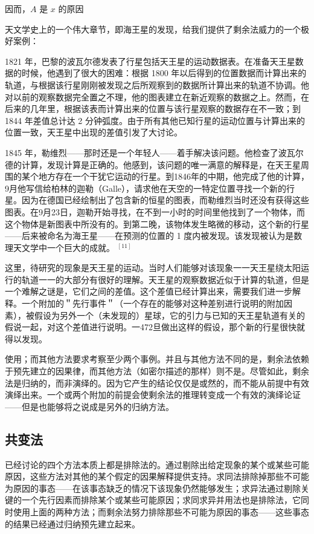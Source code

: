 因而，$A$ 是 $x$ 的原因

天文学史上的一个伟大章节，即海王星的发现，给我们提供了剩余法威力的一个极好案例：

1821 年，巴黎的波瓦尔德发表了行星包括天王星的运动数据表。在准备天王星数据的时候，他遇到了很大的困难：根据 1800 年以后得到的位置数据而计算出来的轨道，与根据该行星刚刚被发现之后所观察到的数据所计算出来的轨道不协调。他对以前的观察数据完全置之不理，他的图表建立在新近观察的数据之上。然而，在后来的几年里，根据该表而计算出来的位置与该行星观察的数据存在不一致；到 1844 年差值总计达 2 分钟弧度。由于所有其他已知行星的运动位置与计算出来的位置一致，天王星中出现的差值引发了大讨论。

1845 年，勒维烈——那时还是一个年轻人——着手解决该问题。他检查了波瓦尔德的计算，发现计算是正确的。他感到，该问题的唯一满意的解释是，在天王星周围的某个地方存在一个干犹它运动的行星。到1846年的中期，他完成了他的计算， 9月他写信给柏林的迦勒（Galle），请求他在天空的一特定位置寻找一个新的行星。因为在德国已经绘制出了包含新的恒星的图表，而勒维烈当时还没有获得这些图表。在9月23日，迦勒开始寻找，在不到一小时的时间里他找到了一个物体，而这个物体是新图表中所没有的。到第二晚，该物体发生略微的移动，这个新的行星——后来被命名为海王星——在预测的位置的 1 度内被发现。该发现被认为是数理天文学中一个巨大的成就。 ${ }^{[11]}$

这里，待研究的现象是天王星的运动。当时人们能够对该现象一一天王星绕太阳运行的轨道一一的大部分有很好的理解。天王星的观察数据近似于计算的轨道，但是一个难解之谜是，它们之间的差值。这个差值已经计算出来，需要我们进一步解释。一个附加的＂先行事件＂（一个存在的能够对这种差别进行说明的附加因素），被假设为另外一个（未发现的）星球，它的引力与已知的天王星轨道有关的假说一起，对这个差值进行说明。一472旦做出这样的假设，那个新的行星很快就得以发现。

使用；而其他方法要求考察至少两个事例。并且与其他方法不同的是，剩余法依赖于预先建立的因果律，而其他方法（如密尔描述的那样）则不是。尽管如此，剩余法是归纳的，而非演绎的。因为它产生的结论仅仅是或然的，而不能从前提中有效演绎出来。一个或两个附加的前提会使剩余法的推理转变成一个有效的演绎论证——但是也能够将之说成是另外的归纳方法。

\subsection{共变法}
已经讨论的四个方法本质上都是排除法的。通过剔除出给定现象的某个或某些可能原因，这些方法对其他的某个假定的因果解释提供支持。求同法排除掉那些不可能为原因的事态——在该事态缺乏的情况下该现象仍然能够发生；求异法通过剔除关键的一个先行因素而排除某个或某些可能原因；求同求异并用法也是排除法，它同时使用上面的两种方法；而剩余法努力排除那些不可能为原因的事态——这些事态的结果已经通过归纳预先建立起来。

